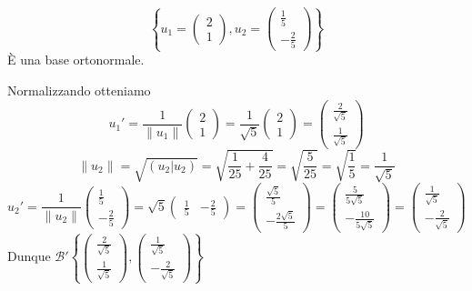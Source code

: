 \documentclass[a4paper]{article}
\theoremstyle{break}
\theoremstyle{break}
\theoremstyle{break}
\theoremstyle{break}
\begin{document}
\begin{example}
  \[
  \left\{ 
    u_1 = \begin{pmatrix} 
      2\\1
    \end{pmatrix} ,
    u_2 = \begin{pmatrix} 
      \frac{1}{5}\\
      -\frac{2}{5}
    \end{pmatrix}
  \right\} 
  \] 
  È una base ortonormale.

  \vspace{1em}
  \noindent Normalizzando otteniamo
  \[
  u_1' = \frac{1}{\|u_1\|}\begin{pmatrix} 2\\1 \end{pmatrix} =
  \frac{1}{\sqrt{5}}\begin{pmatrix} 2\\1 \end{pmatrix} =
  \begin{pmatrix} 
    \frac{2}{\sqrt{5}}\\
    \frac{1}{\sqrt{5}}
  \end{pmatrix} 
  \] 
  \[
  \|u_2\| = \sqrt{(u_2|u_2)} = \sqrt{\frac{1}{25} + \frac{4}{25}} =
  \sqrt{\frac{5}{25}} = \sqrt{\frac{1}{5}} = \frac{1}{\sqrt{5}}
  \] 
  \[
  u_2' = \frac{1}{\|u_2\|}\begin{pmatrix} \frac{1}{5}\\-\frac{2}{5} \end{pmatrix} =
  \sqrt{5}\begin{pmatrix} \frac{1}{5}&-\frac{2}{5} \end{pmatrix} =
  \begin{pmatrix} 
    \frac{\sqrt{5}}{5}\\
    -\frac{2\sqrt{5}}{5}
  \end{pmatrix} 
  =
  \begin{pmatrix} 
    \frac{5}{5 \sqrt{5} }\\
    -\frac{10}{5 \sqrt{5}}
  \end{pmatrix} 
  =
  \begin{pmatrix} 
    \frac{1}{\sqrt{5}}\\
    -\frac{2}{\sqrt{5}}
  \end{pmatrix} 
  \] 
  Dunque \( \mathcal{B}' \left\{ 
    \begin{pmatrix} 
      \frac{2}{\sqrt{5}}\\
      \frac{1}{\sqrt{5}}
    \end{pmatrix},
    \begin{pmatrix} 
      \frac{1}{\sqrt{5}}\\
      -\frac{2}{\sqrt{5}}
    \end{pmatrix}
  \right\}  \) 


\end{example}
\end{document}
